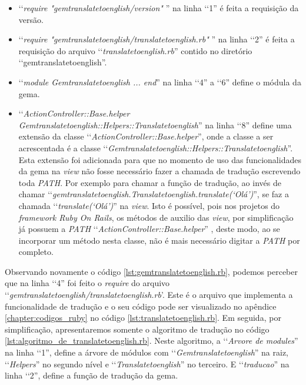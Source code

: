 \begin{itemize}

 \item ‘‘\emph{require "gemtranslatetoenglish/version"} '' na linha ‘‘1'' é feita a requisição da versão.

 \item ‘‘\emph{require "gemtranslatetoenglish/translatetoenglish.rb"} '' na linha ‘‘2'' é feita a requisição
 do arquivo ‘‘\emph{translatetoenglish.rb}'' contido no diretório ‘‘gemtranslatetoenglish''.

 \item ‘‘\emph{module Gemtranslatetoenglish ... end}'' na linha ‘‘4'' a ‘‘6'' define o módula da gema.

 \item ‘‘\emph{ActionController::Base.helper Gemtranslatetoenglish::Helpers::Translatetoenglish}'' na linha
 ‘‘8'' define uma extensão da classe ‘‘\emph{ActionController::Base.helper}'', onde a classe a ser
 acrescentada é a classe ‘‘\emph{Gemtranslatetoenglish::Helpers::Translatetoenglish}''. Esta extensão foi
 adicionada para que no momento de uso das funcionalidades da gema na \emph{view} não fosse necessário
 fazer a chamada de tradução  escrevendo toda \emph{PATH}. Por exemplo para chamar a função de tradução,
 ao invés de chamar ‘‘\emph{gemtranslatetoenglish.Translatetoenglish.translate(‘Olá’)}'', se faz a chamada
 ‘‘\emph{translate(‘Olá’)}'' na \emph{view}. Isto é possível, pois nos projetos do
 \emph{framework Ruby On Rails}, os métodos de auxilio das \emph{view}, por simplificação já possuem a
 \emph{PATH} ‘‘\emph{ActionController::Base.helper}'' , deste modo, ao se incorporar um método nesta classe,
 não é mais necessário digitar a \emph{PATH} por completo.

\end{itemize}

Observando novamente o código \ref{lst:gemtranslatetoenglish.rb}, podemos perceber que na linha ‘‘4''
foi feito o \emph{require} do arquivo ‘‘\emph{gemtranslatetoenglish/translatetoenglish.rb}'. Este é o
arquivo que implementa a funcionalidade de tradução e o seu código pode ser visualizado no apêndice
\ref{chapter:codigos_ruby} no código \ref{lst:translatetoenglish.rb}. Em seguida, por simplificação,
apresentaremos somente o algoritmo de tradução no código \ref{lst:algoritmo_de_translatetoenglish.rb}.
Neste algoritmo, a ‘‘\emph{Arvore de modules}'' na linha ‘‘1'', define a árvore de módulos com
‘‘\emph{Gemtranslatetoenglish}'' na raiz, ‘‘\emph{Helpers}'' no segundo nível e ‘‘\emph{Translatetoenglish}''
no terceiro. E ‘‘\emph{traducao}'' na linha ‘‘2'', define a função de tradução da gema.

